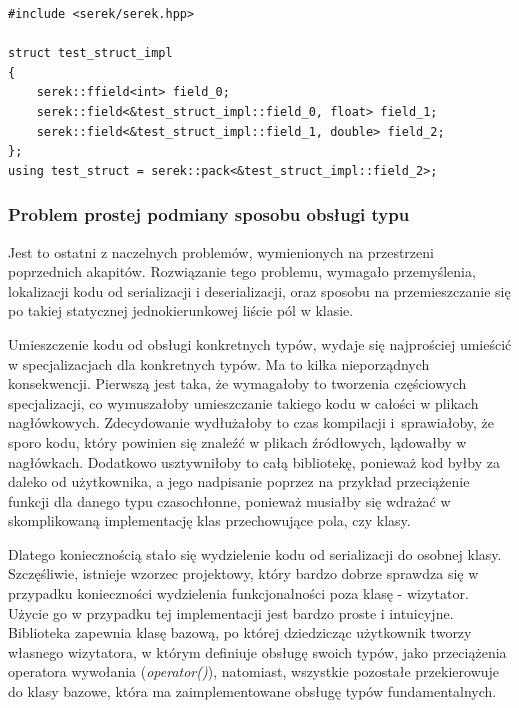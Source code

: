 \documentclass[12pt]{article}
\newcommand{\n}{\newline}
\newcommand{\code}[1]{{\it #1}}
\begin{document}
{{{				\begin{lstlisting}[frame=single]
#include <serek/serek.hpp>

struct test_struct_impl
{
	serek::ffield<int> field_0;
	serek::field<&test_struct_impl::field_0, float> field_1;
	serek::field<&test_struct_impl::field_1, double> field_2;
};
using test_struct = serek::pack<&test_struct_impl::field_2>;
				\end{lstlisting}
			}

			{
				\subsubsection{Problem prostej podmiany sposobu obsługi typu}

				Jest to ostatni z naczelnych problemów, wymienionych na przestrzeni poprzednich akapitów. Rozwiązanie tego problemu,
				wymagało przemyślenia, lokalizacji kodu od serializacji i deserializacji, oraz sposobu na przemieszczanie się po takiej
				statycznej jednokierunkowej liście pól w klasie.\n

				Umieszczenie kodu od obsługi konkretnych typów, wydaje się najprościej umieścić w specjalizacjach dla konkretnych typów.
				Ma to kilka nieporządnych konsekwencji. Pierwszą jest taka, że wymagałoby to tworzenia częściowych specjalizacji, co
				wymuszałoby umieszczanie takiego kodu w całości w plikach nagłówkowych. Zdecydowanie wydłużałoby to czas kompilacji
				i~sprawiałoby, że sporo kodu, który powinien się znaleźć w plikach źródłowych, lądowałby w nagłówkach. Dodatkowo
				usztywniłoby to całą bibliotekę, ponieważ kod byłby za daleko od użytkownika, a jego nadpisanie poprzez na przykład
				przeciążenie funkcji dla danego typu czasochłonne, ponieważ musiałby się wdrażać w skomplikowaną implementację klas
				przechowujące pola, czy klasy.\n

				Dlatego koniecznością stało się wydzielenie kodu od serializacji do osobnej klasy. Szczęśliwie, istnieje wzorzec projektowy,
				który bardzo dobrze sprawdza się w przypadku konieczności wydzielenia funkcjonalności poza klasę - wizytator\cite{visitor_description}.
				Użycie go w przypadku tej implementacji jest bardzo proste i intuicyjne. Biblioteka zapewnia klasę bazową, po której dziedzicząc
				użytkownik tworzy własnego wizytatora, w którym definiuje obsługę swoich typów, jako przeciążenia operatora wywołania (\code{operator()}),
				natomiast, wszystkie pozostałe przekierowuje do klasy bazowe, która ma zaimplementowane obsługę typów fundamentalnych.\n

}}}
\end{document}
